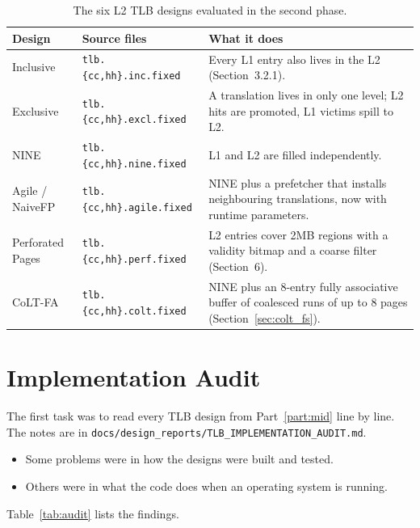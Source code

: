 \begin{table}[H]
\centering
\small
\caption{The six L2 TLB designs evaluated in the second phase.}
\label{tab:designs}
\begin{tabularx}{\textwidth}{l l X}
\toprule
\textbf{Design} & \textbf{Source files} & \textbf{What it does} \\
\midrule
Inclusive & \texttt{tlb.\{cc,hh\}.inc.fixed} & Every L1 entry also lives in the L2 (Section~3.2.1). \\
Exclusive & \texttt{tlb.\{cc,hh\}.excl.fixed} & A translation lives in only one level; L2 hits are promoted, L1 victims spill to L2. \\
NINE & \texttt{tlb.\{cc,hh\}.nine.fixed} & L1 and L2 are filled independently. \\
Agile / NaiveFP & \texttt{tlb.\{cc,hh\}.agile.fixed} & NINE plus a prefetcher that installs neighbouring translations, now with runtime parameters. \\
Perforated Pages & \texttt{tlb.\{cc,hh\}.perf.fixed} & L2 entries cover 2MB regions with a validity bitmap and a coarse filter (Section~6). \\
CoLT-FA & \texttt{tlb.\{cc,hh\}.colt.fixed} & NINE plus an 8-entry fully associative buffer of coalesced runs of up to 8 pages (Section~\ref{sec:colt_fs}). \\
\bottomrule
\end{tabularx}
\end{table}

\section{Implementation Audit}
\label{sec:audit}

The first task was to read every TLB design from Part~\ref{part:mid} line by line. The notes are in \texttt{docs/design\_reports/TLB\_IMPLEMENTATION\_AUDIT.md}.
\begin{itemize}
    \item Some problems were in how the designs were built and tested.
    \item Others were in what the code does when an operating system is running.
\end{itemize}
Table~\ref{tab:audit} lists the findings.

